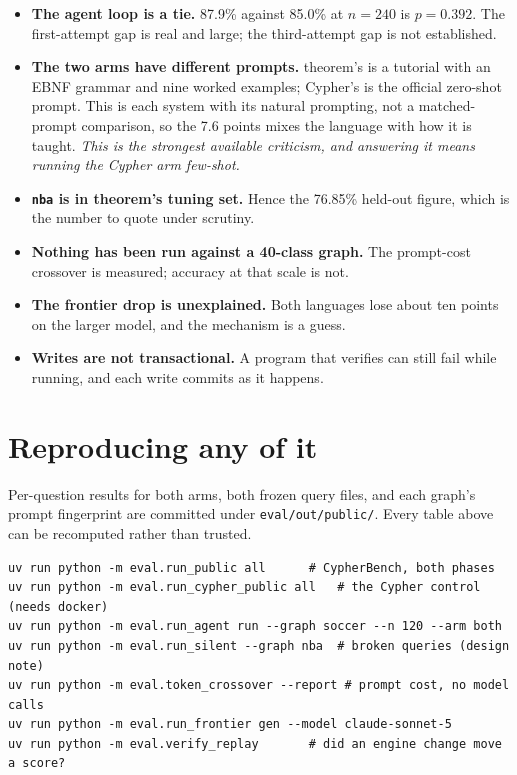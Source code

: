 \documentclass[11pt]{article}
\begin{document}
\begin{itemize}
  \item \textbf{The agent loop is a tie.} 87.9\% against 85.0\% at $n=240$ is
    $p = 0.392$. The first-attempt gap is real and large; the third-attempt gap
    is not established.
  \item \textbf{The two arms have different prompts.} theorem's is a tutorial
    with an EBNF grammar and nine worked examples; Cypher's is the official
    zero-shot prompt. This is each system with its natural prompting, not a
    matched-prompt comparison, so the 7.6 points mixes the language with how it
    is taught. \emph{This is the strongest available criticism, and answering it
    means running the Cypher arm few-shot.}
  \item \textbf{\texttt{nba} is in theorem's tuning set.} Hence the 76.85\%
    held-out figure, which is the number to quote under scrutiny.
  \item \textbf{Nothing has been run against a 40-class graph.} The prompt-cost
    crossover is measured; accuracy at that scale is not.
  \item \textbf{The frontier drop is unexplained.} Both languages lose about ten
    points on the larger model, and the mechanism is a guess.
  \item \textbf{Writes are not transactional.} A program that verifies can still
    fail while running, and each write commits as it happens.
\end{itemize}

\section{Reproducing any of it}

Per-question results for both arms, both frozen query files, and each graph's
prompt fingerprint are committed under \texttt{eval/out/public/}. Every table
above can be recomputed rather than trusted.

\begin{lstlisting}[style=gl]
uv run python -m eval.run_public all      # CypherBench, both phases
uv run python -m eval.run_cypher_public all   # the Cypher control (needs docker)
uv run python -m eval.run_agent run --graph soccer --n 120 --arm both
uv run python -m eval.run_silent --graph nba  # broken queries (design note)
uv run python -m eval.token_crossover --report # prompt cost, no model calls
uv run python -m eval.run_frontier gen --model claude-sonnet-5
uv run python -m eval.verify_replay       # did an engine change move a score?
\end{lstlisting}
\end{document}
